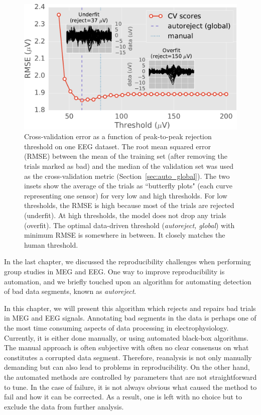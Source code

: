 \begin{figure}[t]
	\centering
	\includegraphics[width=0.8\linewidth]{figures/figure1.pdf}
    \caption[Cross-validation error as a function of peak-to-peak rejection threshold on one EEG dataset.]{Cross-validation error as a function of peak-to-peak rejection threshold on one EEG dataset. The root mean squared error (RMSE) between the mean of the training set (after removing the trials marked as bad) and the median of the validation set was used as the cross-validation metric (Section~\ref{sec:auto_global}). The two insets show the average of the trials as ``butterfly plots" (each curve representing one sensor) for very low and high thresholds. For low thresholds, the RMSE is high because most of the trials are rejected (underfit). At high thresholds, the model does not drop any trials (overfit). The optimal data-driven threshold (\emph{autoreject, global}) with minimum RMSE is somewhere in between. It closely matches the human threshold.}
    \label{fig:cross_val}
\end{figure}

In the last chapter, we discussed the reproducibility challenges when performing group studies in \ac{MEG} and \ac{EEG}. One way to improve reproducibility is automation, and we briefly touched upon an algorithm for automating detection of bad data segments, known as \emph{autoreject}.

In this chapter, we will present this algorithm which rejects and repairs bad trials in \ac{MEG} and \ac{EEG} signals. Annotating bad segments in the data is perhaps one of the most time consuming aspects of data processing in electrophysiology. Currently, it is either done manually, or using automated black-box algorithms. The manual approach is often subjective with often no clear consensus on what constitutes a corrupted data segment. Therefore, reanalysis is not only manually demanding but can also lead to problems in reproducibility. On the other hand, the automated methods are controlled by parameters that are not straightforward to tune. In the case of failure, it is not always obvious what caused the method to fail and how it can be corrected. As a result, one is left with no choice but to exclude the data from further analysis.

